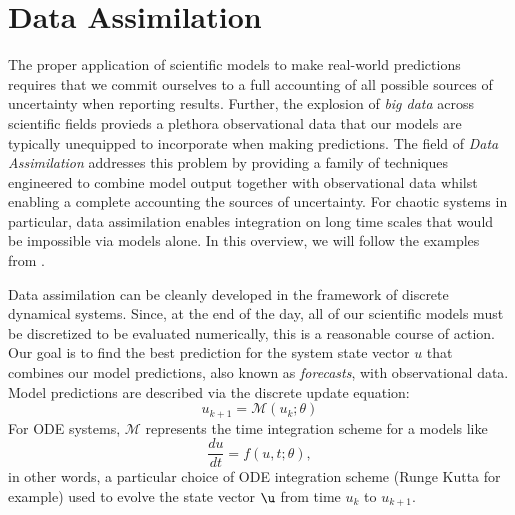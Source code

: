 \section{Data Assimilation}



The proper application of scientific models to make real-world predictions requires that we commit ourselves to a full accounting of all possible sources of uncertainty when reporting results. Further, the explosion of \textit{big data} across scientific fields provieds a plethora observational data that our models are typically unequipped to incorporate when making predictions. The field of \textit{Data Assimilation} addresses this problem by providing a family of techniques engineered to combine model output together with observational data whilst enabling a complete accounting the sources of uncertainty. For chaotic systems in particular, data assimilation enables integration on long time scales that would be impossible via models alone. In this overview, we will follow the examples from \cite{pyda}.

Data assimilation can be cleanly developed in the framework of discrete dynamical systems. Since, at the end of the day, all of our scientific models must be discretized to be evaluated numerically, this is a reasonable course of action. Our goal is to find the best prediction for the system state vector $u$ that combines our model predictions, also known as \textit{forecasts}, with observational data. Model predictions are described via the discrete update equation:
\begin{equation}
    u_{k+1} = \mathcal{M}(u_k; \theta)
\end{equation}
For ODE systems, $\mathcal{M}$ represents the time integration scheme for a models like
\begin{equation}
    \dfrac{du}{dt} = f(u, t; \theta),
\end{equation}
in other words, a particular choice of ODE integration scheme (Runge Kutta for example) used to evolve the state vector $\u$ from time $u_k$ to $u_{k+1}$.

